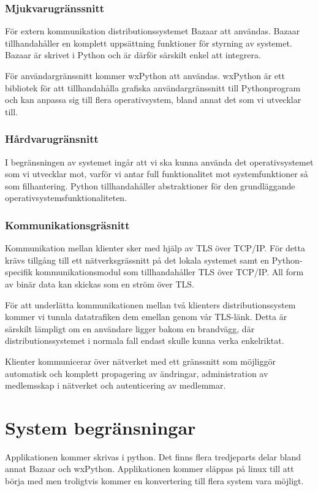 \subsubsection{Mjukvarugränssnitt}
För extern kommunikation distributionssystemet Bazaar att användas. Bazaar tillhandahåller en komplett uppsättning funktioner för styrning av systemet. Bazaar är skrivet i Python och är därför särskilt enkel att integrera.

För användargränssnitt kommer wxPython att användas. wxPython är ett bibliotek för att tillhandahålla grafiska användargränssnitt till Pythonprogram och kan anpassa sig till flera operativsystem, bland annat det som vi utvecklar till.

\subsubsection{Hårdvarugränsnitt}
I begränsningen av systemet ingår att vi ska kunna använda det operativsystemet som vi utvecklar mot, varför vi antar full funktionalitet mot systemfunktioner så som filhantering. Python tillhandahåller abstraktioner för den grundläggande operativsystemsfunktionaliteten.

\subsubsection{Kommunikationsgräsnitt}
Kommunikation mellan klienter sker med hjälp av TLS över TCP/IP. För detta krävs tillgång till ett nätverksgrässnitt på det lokala systemet samt en Python-specifik kommunikationsmodul som tillhandahåller TLS över TCP/IP. All form av binär data kan skickas som en ström över TLS.

För att underlätta kommunikationen mellan två klienters distributionssystem kommer vi tunnla datatrafiken dem emellan genom vår TLS-länk. Detta är särskilt lämpligt om en användare ligger bakom en brandvägg, där distributionssystemet i normala fall endast skulle kunna verka enkelriktat.

Klienter kommunicerar över nätverket med ett gränssnitt som möjliggör automatisk och komplett propagering av ändringar, administration av medlemsskap i nätverket och autenticering av medlemmar.


\section{System begränsningar}
Applikationen kommer skrivas i python. Det finns flera tredjeparts delar bland annat Bazaar och wxPython. Applikationen kommer släppas på linux till att börja med men troligtvis kommer en konvertering till flera system vara möjligt.

